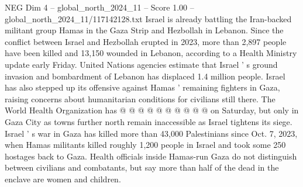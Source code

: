 \begin{textsample}{NEG Dim 4 – global\_north\_2024\_11 – Score 1.00 – global\_north\_2024\_11/117142128.txt}
Israel is already battling the Iran-backed militant group Hamas in the Gaza Strip and Hezbollah in Lebanon.
Since the conflict between Israel and Hezbollah erupted in 2023, more than 2,897 people have been killed and 13,150 wounded in Lebanon, according to a Health Ministry update early Friday.
United Nations agencies estimate that Israel ' s ground invasion and bombardment of Lebanon has displaced 1.4 million people.
Israel has also stepped up its offensive against Hamas ' remaining fighters in Gaza, raising concerns about humanitarian conditions for civilians still there.
The World Health Organization has @ @ @ @ @ @ @ @ @ @ on Saturday, but only in Gaza City as towns further north remain inaccessible as Israel tightens its siege.
Israel ' s war in Gaza has killed more than 43,000 Palestinians since Oct. 7, 2023, when Hamas militants killed roughly 1,200 people in Israel and took some 250 hostages back to Gaza.
Health officials inside Hamas-run Gaza do not distinguish between civilians and combatants, but say more than half of the dead in the enclave are women and children.

\end{textsample}
